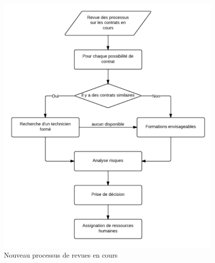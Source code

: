 \begin{figure}[h!]
	\centering
	\includegraphics[width=0.45\linewidth]{images/processus_revues_actuels.png}
	\caption{Nouveau processus de revues en cours}
	\label{fig:processusRevueCours}
\end{figure}

